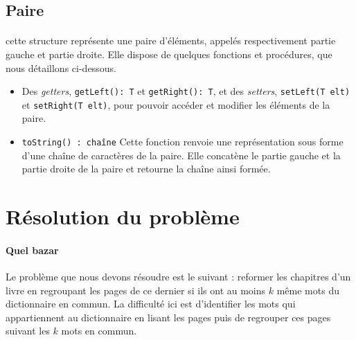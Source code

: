 \documentclass[a4paper]{article}
\begin{document}
		\subsection{Paire}
	    	\paragraph{}{cette structure représente une paire d'éléments, appelés respectivement partie gauche et partie droite. Elle dispose de quelques fonctions et procédures, que nous détaillons ci-dessous.}
	    	
	    	\begin{itemize}
	    	
	    		\item Des \textit{getters}, \verb|getLeft(): T| et \verb|getRight(): T|, et des \textit{setters}, \verb|setLeft(T elt)| et \verb|setRight(T elt)|, pour pouvoir accéder et modifier les éléments de la paire.
	    		
	    		\item \verb|toString() : chaîne| Cette fonction renvoie une représentation sous forme d'une chaîne de caractères de la paire. Elle concatène le partie gauche et la partie droite de la paire et retourne la chaîne ainsi formée.
	    		
	    	\end{itemize}
		
		
	\section{Résolution du problème}
	
		\paragraph{Quel bazar}{
		Le problème que nous devons résoudre est le suivant : reformer les chapitres d'un livre en regroupant les pages 
		de ce dernier si ils ont au moins $k$ même mots du dictionnaire en commun. La difficulté ici est d'identifier
		les mots qui appartiennent au dictionnaire en lisant les pages puis de regrouper ces pages suivant les $k$ mots en
		commun.
		}
	
\end{document}
